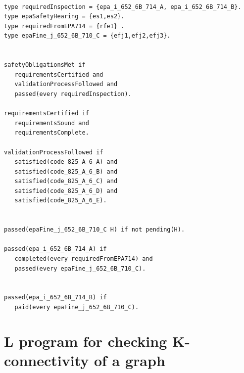\documentclass[a4paper,10pt]{article}
\providecommand{\DIFaddbegin}{} %
\providecommand{\DIFaddend}{} %
\providecommand{\DIFdelbegin}{} %
\providecommand{\DIFdelend}{} %
\begin{document}

\DIFdelend \DIFaddbegin \begin{verbatim}

type requiredInspection = {epa_i_652_6B_714_A, epa_i_652_6B_714_B}.
type epaSafetyHearing = {es1,es2}.
type requiredFromEPA714 = {rfe1} .
type epaFine_j_652_6B_710_C = {efj1,efj2,efj3}.


safetyObligationsMet if
   requirementsCertified and
   validationProcessFollowed and
   passed(every requiredInspection).

requirementsCertified if
   requirementsSound and
   requirementsComplete.

validationProcessFollowed if
   satisfied(code_825_A_6_A) and
   satisfied(code_825_A_6_B) and
   satisfied(code_825_A_6_C) and
   satisfied(code_825_A_6_D) and
   satisfied(code_825_A_6_E).


passed(epaFine_j_652_6B_710_C H) if not pending(H).

passed(epa_i_652_6B_714_A) if
   completed(every requiredFromEPA714) and
   passed(every epaFine_j_652_6B_710_C).


passed(epa_i_652_6B_714_B) if
   paid(every epaFine_j_652_6B_710_C).
\end{verbatim}
\DIFaddend \pagebreak
\section{L program for checking K-connectivity of a graph}\label{B}
\DIFdelbegin %





\end{document}
